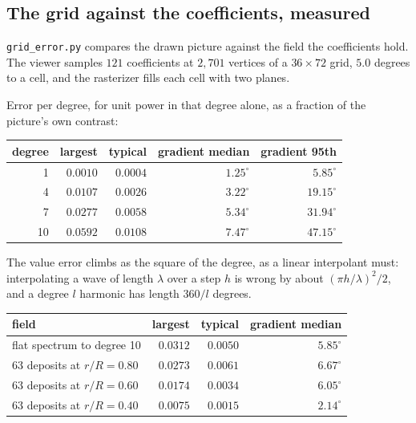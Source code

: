 \subsection{The grid against the coefficients, measured}

\texttt{grid\_error.py} compares the drawn picture against the field the coefficients hold. The viewer samples \(121\) coefficients at \(2{,}701\) vertices of a \(36 \times 72\) grid, \(5.0\) degrees to a cell, and the rasterizer fills each cell with two planes.

Error per degree, for unit power in that degree alone, as a fraction of the picture's own contrast:

\begin{center}
\begin{tabular}{@{}rrrrr@{}}
\toprule
degree & largest & typical & gradient median & gradient 95th \\
\midrule
1 & \(0.0010\) & \(0.0004\) & \(1.25^\circ\) & \(5.85^\circ\) \\
4 & \(0.0107\) & \(0.0026\) & \(3.22^\circ\) & \(19.15^\circ\) \\
7 & \(0.0277\) & \(0.0058\) & \(5.34^\circ\) & \(31.94^\circ\) \\
10 & \(0.0592\) & \(0.0108\) & \(7.47^\circ\) & \(47.15^\circ\) \\
\bottomrule
\end{tabular}
\end{center}

The value error climbs as the square of the degree, as a linear interpolant must: interpolating a wave of length \(\lambda\) over a step \(h\) is wrong by about \((\pi h/\lambda)^2/2\), and a degree \(l\) harmonic has length \(360/l\) degrees.

\begin{center}
\begin{tabular}{@{}lrrr@{}}
\toprule
field & largest & typical & gradient median \\
\midrule
flat spectrum to degree 10 & \(0.0312\) & \(0.0050\) & \(5.85^\circ\) \\
63 deposits at \(r/R = 0.80\) & \(0.0273\) & \(0.0061\) & \(6.67^\circ\) \\
63 deposits at \(r/R = 0.60\) & \(0.0174\) & \(0.0034\) & \(6.05^\circ\) \\
63 deposits at \(r/R = 0.40\) & \(0.0075\) & \(0.0015\) & \(2.14^\circ\) \\
\bottomrule
\end{tabular}
\end{center}


